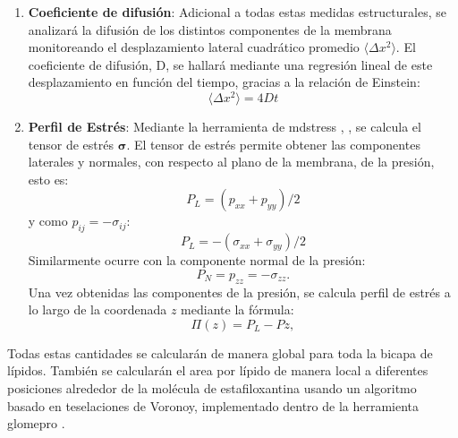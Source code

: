 \begin{enumerate}
\item \textbf{Coeficiente de difusi\'{o}n}: 
Adicional a todas estas medidas estructurales, se analizar\'{a} la difusi\'{o}n de los distintos componentes de la membrana monitoreando el desplazamiento lateral cuadr\'{a}tico promedio $\langle\Delta x^2\rangle$. El coeficiente de difusi\'{o}n, D, se hallar\'{a} mediante una regresi\'{o}n lineal de este desplazamiento en funci\'{o}n del tiempo, gracias a la relaci\'{o}n de Einstein:
\begin{equation}
\langle\Delta x^2\rangle= 4Dt
 \end{equation}
\item \textbf{Perfil de Estr\'{e}s}: Mediante la herramienta de mdstress \cite{Vanegas2020MdStress.org}, \cite{Vanegas2014ImportanceSimulations}, se calcula el tensor de estr\'{e}s $\mathbf{\sigma}$. El tensor de estr\'{e}s permite obtener las componentes laterales y normales, con respecto al plano de la membrana, de la presi\'{o}n, esto es:
\begin{equation}
    P_{L}=\left(p_{xx}+p_{yy}\right)/2
\end{equation}
y como $p_{ij}=-\sigma_{ij}$:
\begin{equation}
    P_{L}=-\left(\sigma_{xx}+\sigma_{yy}\right)/2
\end{equation}
Similarmente ocurre con la componente normal de la presi\'{o}n:
\begin{equation}
    P_{N}=p_{zz}=-\sigma_{zz}.
\end{equation}
Una vez obtenidas las componentes de la presi\'{o}n, se calcula perfil de estr\'{e}s a lo largo de la coordenada $z$ mediante la f\'{o}rmula:
\begin{equation}
    \Pi(z)=P_{L}-P{z},
\end{equation}
\end{enumerate}
Todas estas cantidades se calcular\'{a}n de manera global para toda la bicapa de l\'{i}pidos. Tambi\'{e}n se calcular\'{a}n el area por l\'{i}pido de manera local a diferentes posiciones alrededor de la mol\'{e}cula de estafiloxantina usando un algoritmo basado en teselaciones de Voronoy, implementado dentro de la herramienta glomepro \cite{Melendez-Delgado2018StudyingBilayers}.\\

















